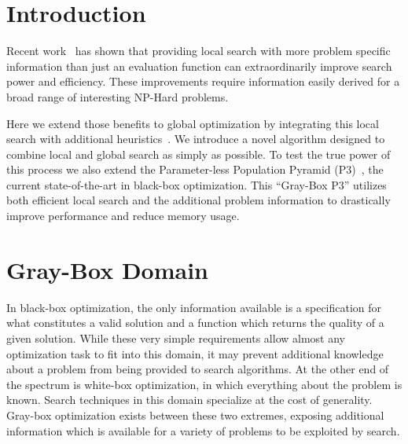 \documentclass{sig-alternate}
\begin{document}




\section{Introduction}

Recent work~\cite{whitley:2013:greedy,chicano:2014:ball} has shown that
providing local search with more problem specific information than just an evaluation function can
extraordinarily improve search power and efficiency. These improvements
require information easily derived for a broad range of interesting NP-Hard
problems.

Here we extend those benefits to global optimization by integrating
this local search with additional heuristics~\cite{chen:2011:memetic}.
We introduce a novel algorithm designed to combine local
and global search as simply as possible. To test the true power of this
process we also extend the Parameter-less Population Pyramid (P3)~\cite{goldman:2014:p3}, the
current state-of-the-art in black-box optimization. This ``Gray-Box P3''
utilizes both efficient local search and the additional problem information
to drastically improve performance and reduce memory usage.

\section{Gray-Box Domain}
\label{sec-gray-box}
In black-box optimization, the only information available is a specification
for what constitutes a valid solution and a function which returns the quality
of a given solution. While these very simple requirements allow almost any
optimization task to fit into this domain, it may prevent additional knowledge
about a problem from being provided to search algorithms. At the other end of
the spectrum is white-box optimization, in which everything about the problem
is known. Search techniques in this domain specialize at the cost of generality.
Gray-box optimization exists between these two extremes, exposing additional
information which is available for a variety of problems to be exploited by search.
\end{document}
